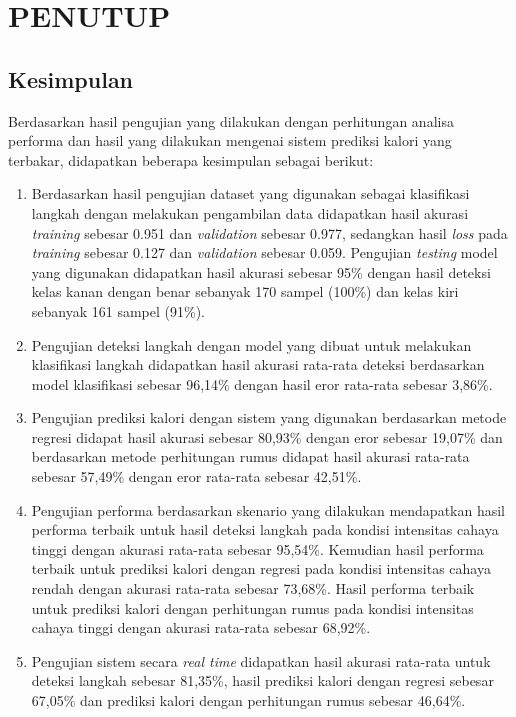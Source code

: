 \chapter{PENUTUP}
\label{chap:penutup}


\section{Kesimpulan}
\label{sec:kesimpulan}

Berdasarkan hasil pengujian yang dilakukan dengan perhitungan analisa performa dan hasil yang dilakukan mengenai sistem prediksi kalori yang terbakar, didapatkan beberapa kesimpulan sebagai berikut:

\begin{enumerate}[nolistsep]

  \item Berdasarkan hasil pengujian dataset yang digunakan sebagai klasifikasi langkah dengan melakukan pengambilan data didapatkan hasil akurasi \emph{training} sebesar 0.951 dan \emph{validation} sebesar 0.977, sedangkan hasil \emph{loss} pada \emph{training} sebesar 0.127 dan \emph{validation} sebesar 0.059. Pengujian \emph{testing} model yang digunakan didapatkan hasil akurasi sebesar 95\% dengan hasil deteksi kelas kanan dengan benar sebanyak 170 sampel (100\%) dan kelas kiri sebanyak 161 sampel (91\%).

  \item Pengujian deteksi langkah dengan model yang dibuat untuk melakukan klasifikasi langkah didapatkan hasil akurasi rata-rata deteksi berdasarkan model klasifikasi sebesar 96,14\% dengan hasil eror rata-rata sebesar 3,86\%.
  
  \item Pengujian prediksi kalori dengan sistem yang digunakan berdasarkan metode regresi didapat hasil akurasi sebesar 80,93\% dengan eror sebesar 19,07\% dan berdasarkan metode perhitungan rumus didapat hasil akurasi rata-rata sebesar 57,49\% dengan eror rata-rata sebesar 42,51\%.
  
  \item Pengujian performa berdasarkan skenario yang dilakukan mendapatkan hasil performa terbaik untuk hasil deteksi langkah pada kondisi intensitas cahaya tinggi dengan akurasi rata-rata sebesar 95,54\%. Kemudian hasil performa terbaik untuk prediksi kalori dengan regresi pada kondisi intensitas cahaya rendah dengan akurasi rata-rata sebesar 73,68\%. Hasil performa terbaik untuk prediksi kalori dengan perhitungan rumus pada kondisi intensitas cahaya tinggi dengan akurasi rata-rata sebesar 68,92\%.
  
  \item Pengujian sistem secara \emph{real time} didapatkan hasil akurasi rata-rata untuk deteksi langkah sebesar 81,35\%, hasil prediksi kalori dengan regresi sebesar 67,05\% dan prediksi kalori dengan perhitungan rumus sebesar 46,64\%.

\end{enumerate}

